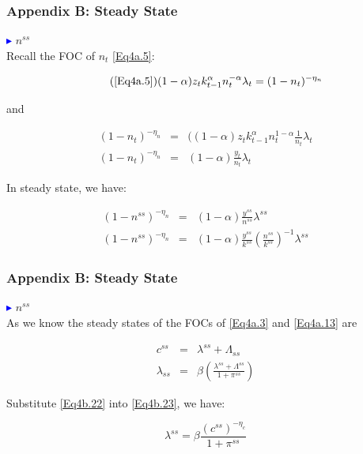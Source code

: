 \begin{frame}
\small

\frametitle{Appendix B: Steady State} \vskip 0.1in

\textcolor{blue}{$\blacktriangleright$}  $n^{ss}$\\

Recall the FOC of $n_{t}$ \eqref{Eq4a.5}:

\begin{equation}\tag{\eqref{Eq4a.5}}
(1-\alpha)z_{t}k_{t-1}^{\alpha}n_{t}^{-\alpha}\lambda_{t} =
(1-n_{t})^{-\eta_{n}}
\end{equation}

and

\begin{eqnarray}
(1-n_{t})^{-\eta_{n}} &=&
((1-\alpha)z_{t}k_{t-1}^{\alpha}n_{t}^{1-\alpha}
\frac{1}{n_{t}}\lambda_{t}
\label{Eq4b.18}\\
(1-n_{t})^{-\eta_{n}} &=& (1-\alpha)\frac{y_{t}}{n_{t}}\lambda_{t}
\label{Eq4b.19}
\end{eqnarray}

In steady state, we have:

\begin{eqnarray}
(1-n^{ss})^{-\eta_{n}} &=&
(1-\alpha)\frac{y^{ss}}{n^{ss}}\lambda^{ss} \label{Eq4b.20}\\
(1-n^{ss})^{-\eta_{n}} &=& (1-\alpha)\frac{y^{ss}}{k^{ss}}
(\frac{n^{ss}}{k^{ss}})^{-1} \lambda^{ss} \label{Eq4b.21}
\end{eqnarray}

\end{frame}

\begin{frame}
\frametitle{Appendix B: Steady State} \vskip 0.1in

\textcolor{blue}{$\blacktriangleright$}  $n^{ss}$\\

As we know the steady states of the FOCs of \eqref{Eq4a.3} and
\eqref{Eq4a.13} are

\begin{eqnarray}
c^{ss} &=& \lambda^{ss}+\Lambda_{ss} \label{Eq4b.22}\\
\lambda_{ss} &=& \beta
(\frac{\lambda^{ss}+\Lambda^{ss}}{1+\pi^{ss}}) \label{Eq4b.23}
\end{eqnarray}

Substitute \eqref{Eq4b.22} into \eqref{Eq4b.23}, we have:

\begin{equation}\label{Eq4b.24}
\lambda^{ss} = \beta \frac{(c^{ss})^{-\eta_{c}}}{1+\pi^{ss}}
\end{equation}

\end{frame}


